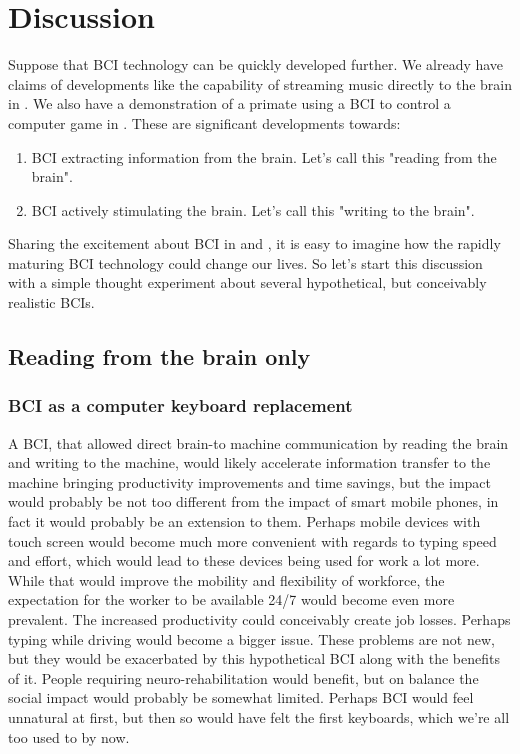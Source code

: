\documentclass[fleqn,11pt]{olplainarticle}
\begin{document}
\section{Discussion}
Suppose that BCI technology can be quickly developed further. We already have claims of developments like the capability of streaming music directly to the brain in \cite{pero_2020}. We also have a demonstration of a primate using a BCI to control a computer game in \cite{wakefield_2020}. These are significant developments towards:
\begin{enumerate}
    \item BCI extracting information from the brain. Let's call this "reading from the brain".
    \item BCI actively stimulating the brain. Let's call this "writing to the brain".
\end{enumerate}

Sharing the excitement about BCI in \cite{warwick2003cyborg} and \cite{schalk2008brain}, it is easy to imagine how the rapidly maturing BCI technology could change our lives. So let's start this discussion with a simple thought experiment about several hypothetical, but conceivably realistic BCIs.

\subsection{Reading from the brain only}
\subsubsection{BCI as a computer keyboard replacement}
A BCI, that allowed direct brain-to machine communication by reading the brain and writing to the machine, would likely accelerate information transfer to the machine \cite{schalk2008brain} bringing productivity improvements and time savings, but the impact would probably be not too different from the impact of smart mobile phones, in fact it would probably be an extension to them. Perhaps mobile devices with touch screen would become much more convenient with regards to typing speed and effort, which would lead to these devices being used for work a lot more. While that would improve the mobility and flexibility of workforce, the expectation for the worker to be available 24/7 would become even more prevalent. The increased productivity could conceivably create job losses. Perhaps typing while driving would become a bigger issue. These problems are not new, but they would be exacerbated by this hypothetical BCI along with the benefits of it. People requiring neuro-rehabilitation would benefit, but on balance the social impact would probably be somewhat limited. Perhaps BCI would feel unnatural at first, but then so would have felt the first keyboards, which we're all too used to by now.
\end{document}
